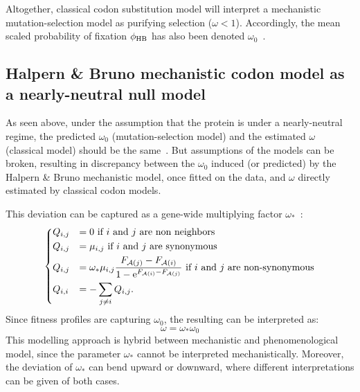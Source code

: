 Altogether, classical codon substitution model will interpret a mechanistic mutation-selection model as purifying selection ($\omega < 1$).
Accordingly, the mean scaled probability of fixation $\phi_{\text{HB}}$ has also been denoted $\omega_0$~\citep{Rodrigue2016}.

\subsection{Halpern \& Bruno mechanistic codon model as a nearly-neutral null model}
\label{subsec:HB-formalism-nearly-neutral-null-model}

As seen above, under the assumption that the protein is under a nearly-neutral regime, the predicted $\omega_0$ (mutation-selection model) and the estimated $\omega$ (classical model) should be the same~\citep{Spielman2015}.
But assumptions of the models can be broken, resulting in discrepancy between the $\omega_0$ induced (or predicted) by the Halpern \& Bruno mechanistic model, once fitted on the data, and $\omega$ directly estimated by classical codon models.

This deviation can be captured as a gene-wide multiplying factor $\omega_*$~\citep{Rodrigue2016}:
\begin{equation}
    \begin{dcases}
        Q_{{i}, {j}} & = 0 \text{ if ${i}$ and ${j}$ are non neighbors} \\
        Q_{{i}, {j}} & = \mu_{{i}, {j}} \text{ if ${i}$ and ${j}$ are synonymous} \\
        Q_{{i}, {j}} & = \omega_* \mu_{{i}, {j}} \dfrac{F_{\mathcal{A}({j})} - F_{\mathcal{A}({i})}}{1 - \mathrm{e}^{F_{\mathcal{A}({i})} - F_{\mathcal{A}({j})}} } \text{ if ${i}$ and ${j}$ are non-synonymous} \\
        Q_{{i}, {i}} & = - \sum\limits_{{j} \neq {i}} Q_{{i}, {j}}.
    \end{dcases}
    \label{eq:propensities-models-omegastar}
\end{equation}
Since fitness profiles are capturing $\omega_0$, the resulting  can be interpreted as:
\begin{equation}
    \omega = \omega_* \omega_0
\end{equation}
This modelling approach is hybrid between mechanistic and phenomenological model, since the parameter $\omega_*$ cannot be interpreted mechanistically.
Moreover, the deviation of $\omega_*$ can bend upward or downward, where different interpretations can be given of both cases.


